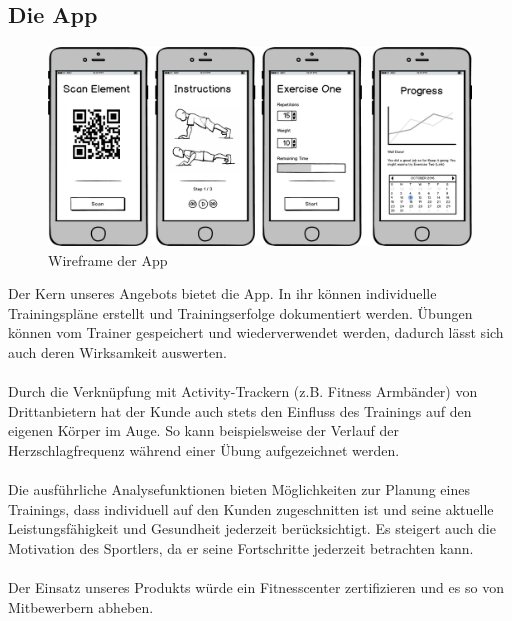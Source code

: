 \subsection{Die App}
\begin{figure}[h]
\centering
\includegraphics[width=0.5\linewidth]{images/app}
\caption{Wireframe der App}
\label{fig:app}
\end{figure}
Der Kern unseres Angebots bietet die App. In ihr können individuelle Trainingspläne erstellt und Trainingserfolge dokumentiert werden. Übungen können vom Trainer gespeichert und wiederverwendet werden, dadurch lässt sich auch deren Wirksamkeit auswerten. \\ \\
Durch die Verknüpfung mit Activity-Trackern (z.B. Fitness Armbänder) von Drittanbietern hat der Kunde auch stets den Einfluss des Trainings auf den eigenen Körper im Auge. So kann beispielsweise der Verlauf der Herzschlagfrequenz während einer Übung aufgezeichnet werden. \\ \\
Die ausführliche Analysefunktionen bieten Möglichkeiten zur Planung eines Trainings, dass individuell auf den Kunden zugeschnitten ist und seine aktuelle Leistungsfähigkeit und Gesundheit jederzeit berücksichtigt. Es steigert auch die Motivation des Sportlers, da er seine Fortschritte jederzeit betrachten kann. \\ \\
Der Einsatz unseres Produkts würde ein Fitnesscenter zertifizieren und es so von Mitbewerbern abheben.

